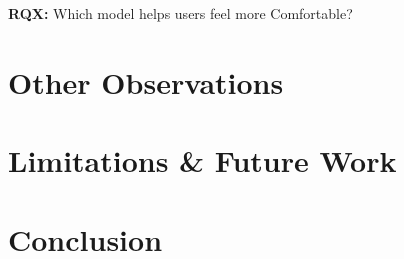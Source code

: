 \documentclass{sig-alternate-05-2015}
\begin{document}
\textbf{RQX:} Which model helps users feel more Comfortable?

















%




\section{Other Observations}
\label{sec:miss}




\section{Limitations \& Future Work}
\label{sec:futurework}






\section{Conclusion}
\label{sec: conclusion}
\end{document}

